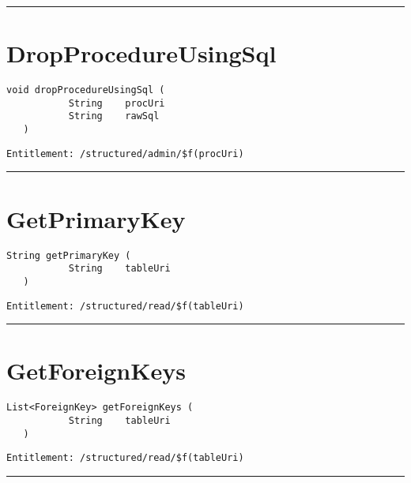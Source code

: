 \rule{12cm}{2pt}
\section{DropProcedureUsingSql}
\label{Api:DropProcedureUsingSql}
\begin{lstlisting}[style=nonumbers]
   void dropProcedureUsingSql (
           String    procUri
           String    rawSql
   )
\end{lstlisting}
\begin{Verbatim}[formatcom=\color{Maroon}]
  Entitlement: /structured/admin/$f(procUri)
\end{Verbatim}



\rule{12cm}{2pt}
\section{GetPrimaryKey}
\label{Api:GetPrimaryKey}
\begin{lstlisting}[style=nonumbers]
   String getPrimaryKey (
           String    tableUri
   )
\end{lstlisting}
\begin{Verbatim}[formatcom=\color{Maroon}]
  Entitlement: /structured/read/$f(tableUri)
\end{Verbatim}



\rule{12cm}{2pt}
\section{GetForeignKeys}
\label{Api:GetForeignKeys}
\begin{lstlisting}[style=nonumbers]
   List<ForeignKey> getForeignKeys (
           String    tableUri
   )
\end{lstlisting}
\begin{Verbatim}[formatcom=\color{Maroon}]
  Entitlement: /structured/read/$f(tableUri)
\end{Verbatim}



\rule{12cm}{2pt}
